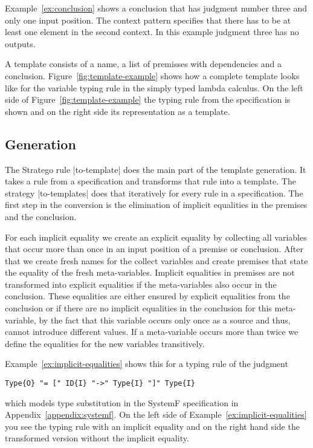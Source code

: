 Example~\ref{ex:conclusion} shows a conclusion that has judgment
number three and only one input position. The context pattern specifies
that there has to be at least one element in the second context. In
this example judgment three has no outputs.

A template consists of a name, a list of premisses with dependencies
and a conclusion. Figure~\ref{fig:template-example} shows how a
complete template looks like for the variable typing rule in the
simply typed lambda calculus. On the left side of
Figure~\ref{fig:template-example} the typing rule from the
specification is shown and on the right side its representation as a
template.

\subsection{Generation}
The Stratego rule \code|to-template| does the main part of the
template generation. It takes a rule from a specification and
transforms that rule into a template. The strategy \code|to-templates|
does that iteratively for every rule in a specification. The first
step in the conversion is the elimination of implicit equalities in
the premises and the conclusion.

For each implicit equality we create an explicit equality by
collecting all variables that occur more than once in an input
position of a premise or conclusion. After that we create fresh names
for the collect variables and create premises that state the equality
of the fresh meta-variables. Implicit equalities in premises are not
transformed into explicit equalities if the meta-variables also occur
in the conclusion. These equalities are either ensured by explicit
equalities from the conclusion or if there are no implicit equalities
in the conclusion for this meta-variable, by the fact that this
variable occurs only once as a source and thus, cannot introduce
different values. If a meta-variable occurs more than twice we define
the equalities for the new variables transitively.

Example~\ref{ex:implicit-equalities} shows this for a typing rule of
the judgment

\begin{lstlisting}[language=sltc]
Type{O} "= [" ID{I} "->" Type{I} "]" Type{I}
\end{lstlisting}

which models type substitution in the SystemF specification in
Appendix~\ref{appendix:systemf}. On the left side of
Example~\ref{ex:implicit-equalities} you see the typing rule with an
implicit equality and on the right hand side the transformed version
without the implicit equality.


